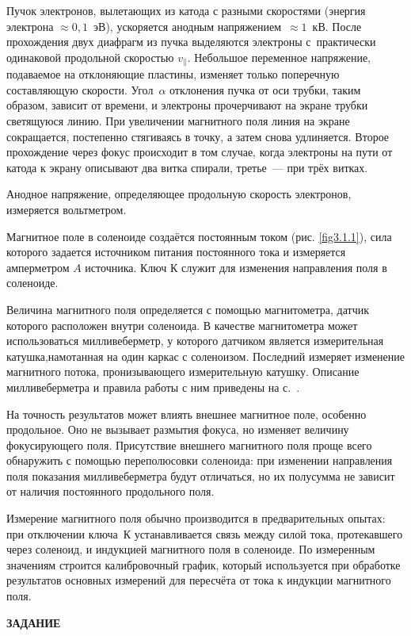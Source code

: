 Пучок электронов, вылетающих из катода с разными скоростями (энергия электрона $\approx 0,1$~эВ), ускоряется анодным напряжением~$\approx 1$~кВ. После прохождения двух диафрагм из пучка выделяются электроны с~практически одинаковой
продольной скоростью $v_{\parallel}$. Небольшое переменное напряжение, подаваемое  на отклоняющие пластины, изменяет  только поперечную составляющую скорости. Угол~$\alpha$ отклонения пучка от оси трубки, таким образом, зависит  от времени, и электроны прочерчивают на экране трубки светящуюся линию. При увеличении магнитного поля линия на экране сокращается, постепенно стягиваясь в точку, а затем снова удлиняется. Второе прохождение через фокус происходит в том случае, когда электроны на пути от катода к экрану описывают два витка спирали, третье~--- при трёх витках.

Анодное напряжение, определяющее продольную скорость электронов, измеряется вольтметром.

Магнитное поле в соленоиде создаётся постоянным током (рис. \ref{fig3.1.1}), сила которого задается источником питания постоянного тока и измеряется амперметром $A$ источника. Ключ К служит для изменения направления поля в соленоиде.

Величина магнитного поля определяется с помощью магнитометра, датчик которого расположен внутри соленоида. В качестве магнитометра  может использоваться милливеберметр, у  которого датчиком является измерительная катушка,намотанная на один каркас с соленоизом. Последний
измеряет изменение магнитного потока, пронизывающего измерительную катушку. Описание милливеберметра и правила работы с ним приведены на с.~\pageref{MWB}.

На точность результатов может влиять внешнее магнитное поле, особенно продольное. Оно не вызывает размытия фокуса, но изменяет величину фокусирующего поля. Присутствие внешнего магнитного поля проще всего обнаружить с помощью
переполюсовки соленоида: при изменении направления поля показания милливеберметра будут отличаться, но их полусумма не зависит от наличия постоянного продольного поля.

Измерение магнитного поля обычно производится в предварительных опытах: при отключении ключа~К устанавливается связь между силой тока, протекавшего через соленоид, и индукцией магнитного поля в соленоиде. По измеренным значениям строится калибровочный график, который используется при обработке результатов основных измерений для пересчёта от тока к индукции магнитного поля.

{\Large \bf ЗАДАНИЕ}

